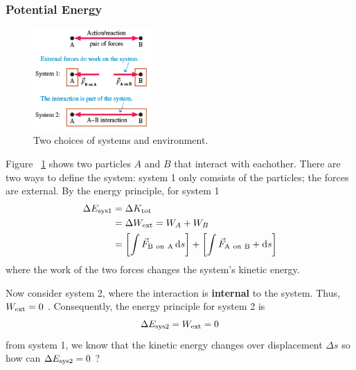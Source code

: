 \subsubsection{Potential Energy}

\begin{figure}
    \centering
    \includegraphics[width=0.4\textwidth]{../figures/two-choices-of-systems.png}
    \caption{Two choices of systems and environment.}%
    \label{fig:two-choies-of-systems}
\end{figure}

Figure~%
\ref{fig:two-choies-of-systems} shows two particles
$
    A
$ and
$
    B
$ that interact with eachother.  There are two ways to define the
system:  system 1 only comsists of the particles; the forces are
external.  By the energy principle, for system 1
\begin{align}
    \Delta E_{\sys 1} &= \Delta K_\tot \\
    &= \Delta W_\ext = W_A + W_B \\
    &= \left[\int \arpair{B}{A} \dif s\right] + \left[\int \arpair{A}{B}
    + \dif s\right]
\end{align}
where the work of the two forces changes the system's kinetic energy.

Now consider system 2, where the interaction is \textbf{internal} to the
system.  Thus,
$
    W_{\mathrm{ext}} = 0
$%
.  Consequently, the energy principle for system 2 is
\begin{equation}
    \Delta E_{\mathrm{sys} 2} = W_{\mathrm{ext}} = 0
\end{equation}
from system 1, we know that the kinetic energy changes over displacement
$
    \Delta s
$ so how can
$
    \Delta E_{\mathrm{sys} 2} = 0
$%
?


